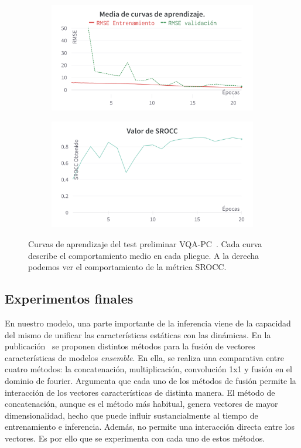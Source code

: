 \begin{figure}[htp]
  \begin{subfigure}[b]{0.49\textwidth}
  \centering
    \includegraphics[width=\textwidth]{imagenes/chapter5/PreTestCurves.png}
  \end{subfigure}
  \begin{subfigure}[b]{0.49\textwidth}
  \centering
    \includegraphics[width=\textwidth]{imagenes/chapter5/PreTestSROCC.png}
  \end{subfigure}
  \caption[Curvas de aprendizaje del test preliminar VQA-PC.]
  {Curvas de aprendizaje del test preliminar VQA-PC~\cite{VQA-PC}. 
  Cada curva describe el comportamiento medio en cada pliegue. A la derecha 
  podemos ver el comportamiento de la métrica SROCC.
} \label{fig:PreTestCurves}
\end{figure}

\subsection{Experimentos finales}
En nuestro modelo, una parte importante de la inferencia viene de la capacidad del mismo de unificar las características 
estáticas con las dinámicas. En la publicación~\cite{EnsemblePCQA} se proponen distintos métodos para la fusión
de vectores características de modelos \emph{ensemble}.
En ella, se realiza una comparativa entre cuatro métodos: la concatenación, multiplicación, convolución 1x1 y 
fusión en el dominio de fourier. 
Argumenta que cada uno de los métodos de fusión permite la interacción de los vectores 
características de distinta manera. El método de concatenación, aunque es el método 
más habitual, genera vectores de mayor dimensionalidad, hecho que puede influir 
sustancialmente al tiempo de entrenamiento e inferencia. Además, no permite una interacción directa entre los vectores. 
Es por ello que se experimenta con cada uno de estos métodos.  

